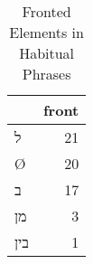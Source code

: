 \begin{table}[htbp!]
\centering
\caption{Fronted Elements in Habitual Phrases}
\label{table:hab_front}
\begin{tabular}{lr}
\toprule
{} &  front \\
\midrule
\texthebrew{ל}   &     21 \\
Ø                &     20 \\
\texthebrew{ב}   &     17 \\
\texthebrew{מן}  &      3 \\
\texthebrew{בין} &      1 \\
\bottomrule
\end{tabular}
\end{table}
